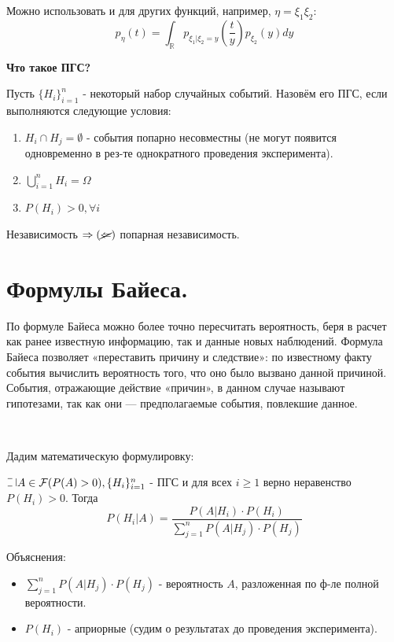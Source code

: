 \noindent Можно использовать и для других функций, например, $\eta = \xi_1 \xi_2$:
\[ p_{\eta} (t) = \int_{\mathbb{R}} p_{\xi_1 | \xi_2 = y} \left( \frac{t}{y} \right) p_{\xi_2} (y) dy \]

\noindent \textbf{Что такое ПГС?}

Пусть $ \{ H_i \}_{i=1}^n $ - некоторый набор случайных событий. Назовём его ПГС, если выполняются следующие условия:
\begin{enumerate}
	\item $H_i \cap H_j = \emptyset$ - события попарно несовместны (не могут появится одновременно в рез-те однократного проведения эксперимента).
	\item $\bigcup\limits_{i=1}^{n} H_i = \Omega$
	\item $P(H_i) > 0, \forall i$
\end{enumerate}

\begin{remark}
	Независимость $\Rightarrow (\cancel{\Leftarrow})$ попарная независимость.
\end{remark}

\section{Формулы Байеса.}

По формуле Байеса можно более точно пересчитать вероятность, беря в расчет как ранее известную информацию, так и данные новых наблюдений. Формула Байеса позволяет «переставить причину и следствие»: по известному факту события вычислить вероятность того, что оно было вызвано данной причиной. События, отражающие действие «причин», в данном случае называют гипотезами, так как они — предполагаемые события, повлекшие данное.

~

Дадим математическую формулировку:

\noindent $\letus A \in \mathcal{F} (P(A) > 0), \{ H_i \}_{i=1}^n$ - ПГС и для всех $i \ge 1$ верно неравенство $P(H_i) > 0$. Тогда
\[ P(H_i|A) = \frac{P(A|H_i) \cdot P(H_i)}{\sum\limits_{j=1}^{n} P(A|H_j) \cdot P(H_j)} \]

Объяснения:
\begin{itemize}
	\item $\sum\limits_{j=1}^{n} P(A|H_j) \cdot P(H_j)$ - вероятность $A$, разложенная по ф-ле полной вероятности.
	\item $P(H_i)$ - априорные (судим о результатах до проведения эксперимента).
\end{itemize}

